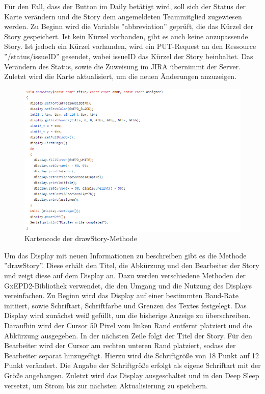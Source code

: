 \documentclass[12pt,titlepage]{scrartcl}
\begin{document}
			\noindent Für den Fall, dass der Button im Daily betätigt wird, soll sich der Status der Karte verändern und die Story dem angemeldeten Teammitglied zugewiesen werden. Zu Beginn wird die Variable ''abbreviation'' geprüft, die das Kürzel der Story gespeichert. Ist kein Kürzel vorhanden, gibt es auch keine anzupassende Story. Ist jedoch ein Kürzel vorhanden, wird ein PUT-Request an den Ressource ''/status/issueID'' gesendet, wobei issueID das Kürzel der Story beinhaltet. Das Verändern des Status, sowie die Zuweisung im JIRA übernimmt der Server. Zuletzt wird die Karte aktualisiert, um die neuen Änderungen anzuzeigen. \\
			 \begin{figure}[H] 
  				\centering
    			\includegraphics[height=0.5\textheight]{storyHelper}
  				\caption{Kartencode der drawStory-Methode}
  				\label{fig:storyHelper}
			\end{figure}
			\noindent Um das Display mit neuen Informationen zu beschreiben gibt es die Methode ''drawStory''. Diese erhält den Titel, die Abkürzung und den Bearbeiter der Story und zeigt diese auf dem Display an. Dazu werden verschiedene Methoden der GxEPD2-Bibliothek verwendet, die den Umgang und die Nutzung des Displays vereinfachen. Zu Beginn wird das Display auf einer bestimmten Baud-Rate initiiert, sowie Schriftart, Schriftfarbe und Grenzen des Textes festgelegt. Das Display wird zunächst weiß gefüllt, um die bisherige Anzeige zu überschreiben. Daraufhin wird der Cursor 50 Pixel vom linken Rand entfernt platziert und die Abkürzung ausgegeben. In der nächsten Zeile folgt der Titel der Story. Für den Bearbeiter wird der Cursor am rechten unteren Rand platziert, sodass der Bearbeiter separat hinzugefügt. Hierzu wird die Schriftgröße von 18 Punkt auf 12 Punkt verändert. Die Angabe der Schriftgröße erfolgt als eigene Schriftart mit der Größe angehangen. Zuletzt wird das Display ausgeschaltet und in den Deep Sleep versetzt, um Strom bis zur nächsten Aktualisierung zu speichern.
\end{document}
